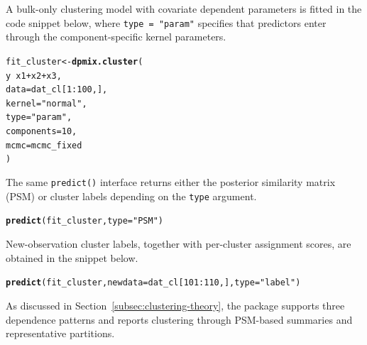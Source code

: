 \documentclass[article]{jss}\usepackage[]{graphicx}\usepackage[]{xcolor}
\makeatletter
\newcommand{\hlnum}[1]{\textcolor[rgb]{0.686,0.059,0.569}{#1}}%
\newcommand{\hlsng}[1]{\textcolor[rgb]{0.192,0.494,0.8}{#1}}%
\newcommand{\hlopt}[1]{\textcolor[rgb]{0,0,0}{#1}}%
\newcommand{\hldef}[1]{\textcolor[rgb]{0.345,0.345,0.345}{#1}}%
\newcommand{\hlkwb}[1]{\textcolor[rgb]{0.69,0.353,0.396}{#1}}%
\newcommand{\hlkwc}[1]{\textcolor[rgb]{0.333,0.667,0.333}{#1}}%
\newcommand{\hlkwd}[1]{\textcolor[rgb]{0.737,0.353,0.396}{\textbf{#1}}}%
\newenvironment{kframe}{%
 \def\at@end@of@kframe{}%
 \ifinner\ifhmode%
  \def\at@end@of@kframe{\end{minipage}}%
  \begin{minipage}{\columnwidth}%
 \fi\fi%
 \def\FrameCommand##1{\hskip\@totalleftmargin \hskip-\fboxsep
 \colorbox{shadecolor}{##1}\hskip-\fboxsep
     \hskip-\linewidth \hskip-\@totalleftmargin \hskip\columnwidth}%
 \MakeFramed {\advance\hsize-\width
   \@totalleftmargin\z@ \linewidth\hsize
   \@setminipage}}%
 {\par\unskip\endMakeFramed%
 \at@end@of@kframe}
\newenvironment{knitrout}{}{} %
\DeclareRobustCommand{\code}[1]{\nolinkurl{#1}}
\makeatother
\begin{document}
A bulk-only clustering model with covariate dependent parameters is fitted
in the code snippet below, where \code{type = "param"} specifies that predictors
enter through the component-specific kernel parameters.

\begin{knitrout}\footnotesize
{}\color{fgcolor}\begin{kframe}
\begin{alltt}
\hldef{fit_cluster} \hlkwb{<-} \hlkwd{dpmix.cluster}\hldef{(}
  \hldef{y} \hlopt{~} \hldef{x1} \hlopt{+} \hldef{x2} \hlopt{+} \hldef{x3,}
  \hlkwc{data}       \hldef{= dat_cl[}\hlnum{1}\hlopt{:}\hlnum{100}\hldef{,],}
  \hlkwc{kernel}     \hldef{=} \hlsng{"normal"}\hldef{,}
  \hlkwc{type}       \hldef{=} \hlsng{"param"}\hldef{,}
  \hlkwc{components} \hldef{=} \hlnum{10}\hldef{,}
  \hlkwc{mcmc} \hldef{= mcmc_fixed}
\hldef{)}
\end{alltt}
\end{kframe}
\end{knitrout}

The same \code{predict()} interface returns either the posterior
similarity matrix (PSM) or cluster labels depending on the \code{type}
argument.
\begin{knitrout}\footnotesize
{}\color{fgcolor}\begin{kframe}
\begin{alltt}
\hlkwd{predict}\hldef{(fit_cluster,} \hlkwc{type} \hldef{=} \hlsng{"PSM"}\hldef{)}
\end{alltt}
\end{kframe}
\end{knitrout}

New-observation cluster labels, together with per-cluster
assignment scores, are obtained in the snippet below.

\begin{knitrout}\footnotesize
{}\color{fgcolor}\begin{kframe}
\begin{alltt}
\hlkwd{predict}\hldef{(fit_cluster,} \hlkwc{newdata} \hldef{= dat_cl[}\hlnum{101}\hlopt{:}\hlnum{110}\hldef{,],} \hlkwc{type} \hldef{=} \hlsng{"label"}\hldef{)}
\end{alltt}
\end{kframe}
\end{knitrout}

As discussed in Section~\ref{subsec:clustering-theory},
the package supports three dependence patterns and reports clustering through
PSM-based summaries and representative partitions.
\end{document}
